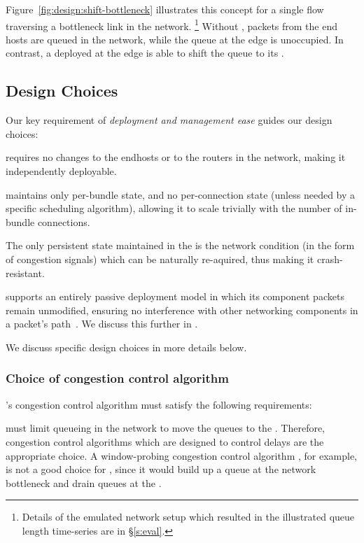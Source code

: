 Figure~\ref{fig:design:shift-bottleneck} illustrates this concept for a single flow traversing a bottleneck link in the network.
\footnote{Details of the emulated network setup which resulted in the illustrated queue length time-series are in \S\ref{s:eval}.} 
Without \name, packets from the end hosts are queued in the network, while the queue at the edge is unoccupied. 
In contrast, a \name deployed at the edge is able to shift the queue to its \inbox.

\subsection{Design Choices}

Our key requirement of \emph{deployment and management ease} guides our design choices:

 \name requires no changes to the endhosts or to the routers in the network, making it independently deployable. 

 \name maintains only per-bundle state, and no per-connection state (unless needed by a specific scheduling algorithm), allowing it to scale trivially with the number of in-bundle connections. 

 The only persistent state maintained in the \name is the network condition (in the form of congestion signals) which can be naturally re-aquired, thus making it crash-resistant. 

 \name supports an entirely passive deployment model in which its component packets remain unmodified, 
ensuring no interference with other networking components in a packet's path~\cite{mboxbadness, ipoptions, quic}.  We discuss this further in .

\vspace{5pt}
\noindent We discuss specific design choices in more details below. 

\subsubsection{Choice of congestion control algorithm}
\name's congestion control algorithm must satisfy the following requirements: 

 \name must limit queueing in the network to move the queues to the \inbox. Therefore, congestion control algorithms which are designed to control delays are the appropriate choice. 
A window-probing congestion control algorithm , for example, is not a good choice for \name, since it would build up a queue at the network bottleneck and drain queues at the \inbox.

